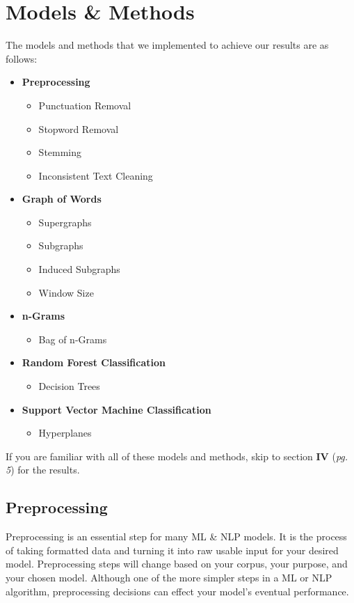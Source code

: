 \documentclass[twoside,twocolumn]{article}
\begin{document}
\section{Models \& Methods}

The models and methods that we implemented to achieve our results are as follows: 
\begin{itemize}
\item \textbf{Preprocessing}
	\begin{itemize}
	\item Punctuation Removal
    \item Stopword Removal
    \item Stemming
    \item Inconsistent Text Cleaning
	\end{itemize}
\item \textbf{Graph of Words}
	\begin{itemize}
    \item Supergraphs
	\item Subgraphs
    \item Induced Subgraphs
    \item Window Size
	\end{itemize}
\item \textbf{n-Grams}
	\begin{itemize}
	\item Bag of n-Grams
	\end{itemize}
\item \textbf{Random Forest Classification}
	\begin{itemize}
	\item Decision Trees
	\end{itemize}
\item \textbf{Support Vector Machine Classification}
	\begin{itemize}
	\item Hyperplanes
	\end{itemize}
\end{itemize}

If you are familiar with all of these models and methods, skip to section \textbf{IV} (\textit{pg. 5}) for the results.

\subsection{Preprocessing}
Preprocessing is an essential step for many ML \& NLP models. It is the process of taking formatted data and turning it into raw usable input for your desired model. Preprocessing steps will change based on your corpus, your purpose, and your chosen model. Although one of the more simpler steps in a ML or NLP algorithm, preprocessing decisions can effect your model's eventual performance.
\end{document}
